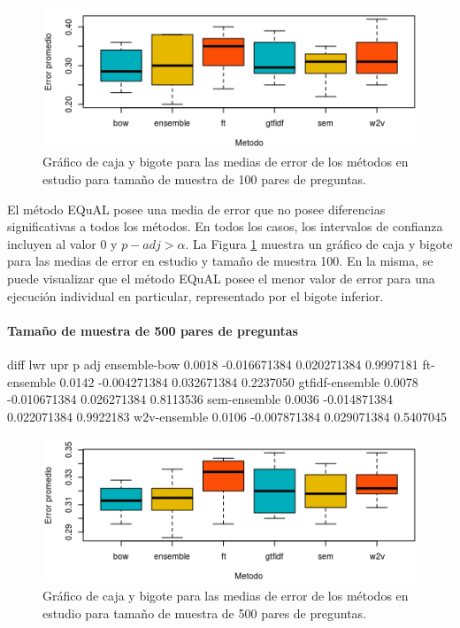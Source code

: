 \begin{figure}[!]
	\centering
	\includegraphics[width=0.7\linewidth]{10_resultados/imagenes/anova_100}
	\caption{Gráfico de caja y bigote para las medias de error de los métodos en estudio para tamaño de muestra de 100 pares de preguntas.}
	\label{fig:anova100}
\end{figure}

\bigskip El método EQuAL posee una media de error que no posee diferencias significativas a todos los métodos. En todos los casos, los intervalos de confianza incluyen al valor 0 y \(p-adj > \alpha\). La Figura \ref{fig:anova100} muestra un gráfico de caja y bigote para las medias de error en estudio y tamaño de muestra 100. En la misma, se puede visualizar que el método EQuAL posee el menor valor de error para una ejecución individual en particular, representado por el bigote inferior.

\bigskip
\paragraph{Tamaño de muestra de 500 pares de preguntas}
\begin{rc}
                  diff          lwr         upr     p adj
ensemble-bow     0.0018 -0.016671384 0.020271384 0.9997181
ft-ensemble      0.0142 -0.004271384 0.032671384 0.2237050
gtfidf-ensemble  0.0078 -0.010671384 0.026271384 0.8113536
sem-ensemble     0.0036 -0.014871384 0.022071384 0.9922183
w2v-ensemble     0.0106 -0.007871384 0.029071384 0.5407045
\end{rc}

\begin{figure}
	\centering
	\includegraphics[width=0.7\linewidth]{10_resultados/imagenes/anova_500}
	\caption{Gráfico de caja y bigote para las medias de error de los métodos en estudio para tamaño de muestra de 500 pares de preguntas.}
	\label{fig:anova500}
\end{figure}

